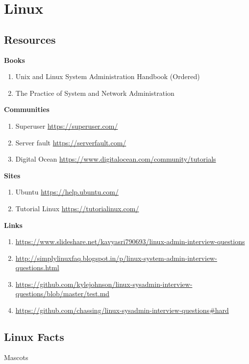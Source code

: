 \documentclass{notes}
\begin{document}
\tableofcontents
\label{sec:front}
\chapter{Linux}
\section{Resources}
	\textbf{Books}
		\begin{enumerate}
			\item Unix and Linux System Administration Handbook (Ordered)
			\item The Practice of System and Network Administration
		\end{enumerate}
	\textbf{Communities}
		\begin{enumerate}
			\item Superuser \ra \url{https://superuser.com/}
			\item Server fault \ra \url{https://serverfault.com/}
			\item Digital Ocean \ra \url{https://www.digitalocean.com/community/tutorials}
		\end{enumerate}
	\textbf{Sites}
		\begin{enumerate}
			\item Ubuntu \ra \url{https://help.ubuntu.com/}
			\item Tutorial Linux \ra \url{https://tutorialinux.com/}
		\end{enumerate}
	\textbf{Links}
		\begin{enumerate}
			\item \url{https://www.slideshare.net/kavyasri790693/linux-admin-interview-questions}
			\item \url{http://simplylinuxfaq.blogspot.in/p/linux-system-admin-interview-questions.html}
			\item \url{https://github.com/kylejohnson/linux-sysadmin-interview-questions/blob/master/test.md}
			\item \url{https://github.com/chassing/linux-sysadmin-interview-questions#hard}
		\end{enumerate}

\newpage

\section{Linux Facts}
	\begin{questions}{Mascots}
		\begin{questionAnswer}
		\end{questionAnswer}
	\end{questions}
\end{document}
